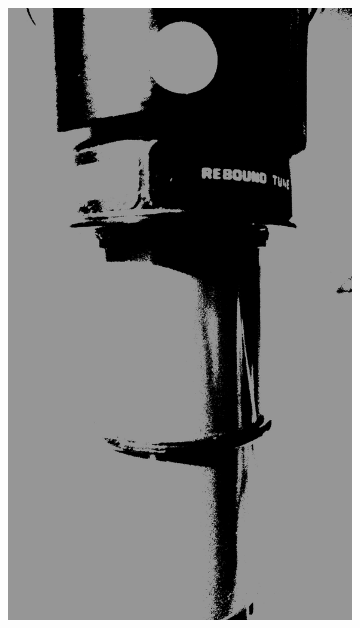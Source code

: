 			\begin{figure}[h!]
				\centering
				\begin{subfigure}[t]{0.4\textwidth}
					\centering
					\includegraphics[scale=0.04]{../images/results/threshold.jpg}
					\label{subfig:threshold}
				\end{subfigure}
				\begin{subfigure}[t]{0.4\textwidth}
					\centering

\end{subfigure}
\end{figure}
